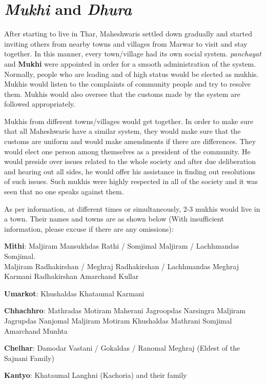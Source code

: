 \chapter{\textit{Mukhi} and \textit{Dhura}}
After starting to live in Thar, Maheshwaris settled down gradually and started
inviting others from nearby towns and villages from Marwar to visit and stay
together. In this manner, every town/village had its own social system.
\textit{panchayat} and \textbf{Mukhi} were appointed in order for a smooth
administration of the system. Normally, people who are leading and of high
status would be elected as mukhis. Mukhis would listen to the complaints of
community people and try to resolve them. Mukhis would also oversee that the
customs made by the system are followed appropriately.

Mukhis from different towns/villages would get together. In order to make sure
that all Maheshwaris have a similar system, they would make sure that the
customs are uniform and would make amendments if there are differences. They
would elect one person among themselves as a president of the community. He
would preside over issues related to the whole society and after due
deliberation and hearing out all sides, he would offer his assistance in
finding out resolutions of such issues. Such mukhis were highly respected in
all of the society and it was seen that no one speaks against them. 

As per information, at different times or simultaneously, 2-3 mukhis would live
in a town. Their names and towns are as shown below (With insufficient
information, please excuse if there are any omissions):

\textbf{Mithi}: Maljiram Mansukhdas Rathi / Somjimal Maljiram / Lachhmandas Somjimal.\\
                Maljiram Radhakirshan / Meghraj Radhakirshan / Lachhmandas Meghraj Karmani
                Radhakirshan Amarchand Kullar

\textbf{Umarkot}: Khushaldas Khataumal Karmani

\textbf{Chhachhro}: Mathradas Motiram Maherani
                    Jagroopdas Narsingra
                    Maljiram Jagrupdas
                    Nanjomal Maljiram
                    Motiram Khushaldas Mathrani
                    Somjimal Amarchand Munhta


\textbf{Chelhar}: Damodar Vastani / Gokaldas / Ranomal
                  Meghraj (Eldest of the Sajnani Family)

\textbf{Kantyo}: Khataumal Langhni (Kachoria) and their family

